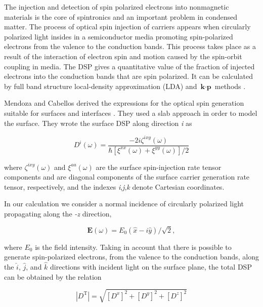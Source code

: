 \documentclass[aps,pra,11pt,tightenlines,showpacs,superscriptaddress,groupedaddress]{revtex4-1}
\begin{document}
The injection and detection of spin polarized electrons into nonmagnetic materials is the core of spintronics \cite{vzutic2004spintronics,fert2008nobel,pezzoli2012optical,bottegoni2013experimental,bottegoni2013photoinduced} and an important problem in condensed matter. The process of optical spin injection of carriers appears when circularly polarized light \cite{dyakonov1984theory} insides in a semiconductor media promoting spin-polarized electrons from the valence to the conduction bands. This process takes place as a result of the interaction of electron spin and motion caused by the spin-orbit coupling in media. The DSP gives a quantitative value of the fraction of injected electrons into the conduction bands that are spin polarized. It can be calculated by full band structure local-density approximation (LDA) and $\textbf{k}\cdot \textbf{p}$ methods \cite{nastos2007full,cabellos2009stress}.

Mendoza and Cabellos derived the expressions for the optical spin generation suitable for surfaces and interfaces \cite{mendoza2012optical}. They used a slab approach in order to model the surface. They wrote the surface DSP along direction \emph{i} as

\begin{equation}
    D^{i}(\omega) = \frac{-2i \zeta^{ixy} (\omega)}{\hbar \left[ \xi^{xx}(\omega) + \xi^{yy}(\omega) \right] /2 } \label{eq:D^i}
\end{equation}

\noindent where $\zeta^{ixy} (\omega)$ and $\xi^{aa}(\omega)$ are the surface spin-injection rate tensor components and are diagonal components of the surface carrier generation rate tensor, respectively, and the indexes \emph{i},\emph{j},\emph{k} denote Cartesian coordinates.

In our calculation we consider a normal incidence of circularly polarized light propagating along the \emph{-z} direction,

\begin{equation*}
    \mathbf{E} (\omega) = E_{0}(\hat{x} -i \hat{y})/\sqrt{2}, 
\end{equation*}


\noindent where $E_{0}$ is the field intensity. Taking in account that there is possible to generate spin-polarized electrons, from the valence to the conduction bands, along the $\hat{i}$, $\hat{j}$, and $\hat{k}$ directions with incident light on the surface plane, the total DSP can be obtained by the relation 

\begin{equation*}
    |{D^{\text{T}}}| = \sqrt{ \left[ D^{x} \right]^{2} + \left[ D^{y} \right]^{2} + \left[ D^{z} \right]^{2} }
\end{equation*}
\end{document}
